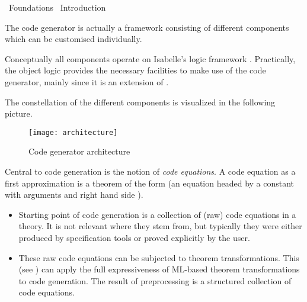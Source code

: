 %
\begin{isabellebody}%
\def\isabellecontext{Foundations}%
%
\isadelimtheory
%
\endisadelimtheory
%
\isatagtheory
{}\isamarkupfalse%
\ Foundations\isanewline
{}\ Introduction\isanewline
{}%
\endisatagtheory
{\isafoldtheory}%
%
\isadelimtheory
%
\endisadelimtheory
%
\isamarkuptrue%
%
\isamarkuptrue%
%
\begin{isamarkuptext}%
The code generator is actually a framework consisting of different
  components which can be customised individually.

  Conceptually all components operate on Isabelle's logic framework
  \hyperlink{theory.Pure}{\mbox{}}.  Practically, the object logic \hyperlink{theory.HOL}{\mbox{}}
  provides the necessary facilities to make use of the code generator,
  mainly since it is an extension of \hyperlink{theory.Pure}{\mbox{}}.

  The constellation of the different components is visualized in the
  following picture.

  \begin{figure}[h]
    \texttt{[image: architecture]}
    \caption{Code generator architecture}
    \label{fig:arch}
  \end{figure}

  \noindent Central to code generation is the notion of \emph{code
  equations}.  A code equation as a first approximation is a theorem
  of the form  (an equation headed by a
  constant  with arguments  and right
  hand side ).

  \begin{itemize}

    \item Starting point of code generation is a collection of (raw)
      code equations in a theory. It is not relevant where they stem
      from, but typically they were either produced by specification
      tools or proved explicitly by the user.
      
    \item These raw code equations can be subjected to theorem
      transformations.  This  (see
      ) can apply the full expressiveness of
      ML-based theorem transformations to code generation.  The result
      of preprocessing is a structured collection of code equations.


\end{itemize}
\end{isamarkuptext}
\end{isabellebody}

